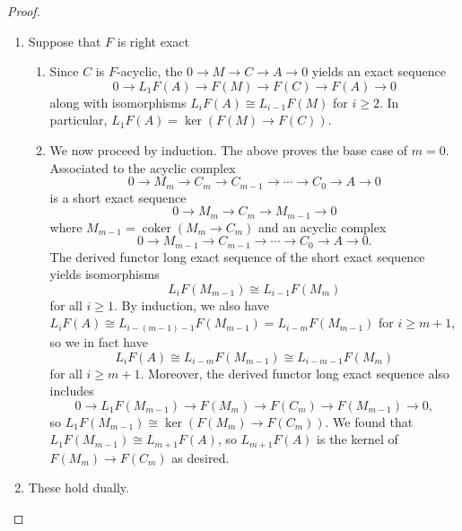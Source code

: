 \begin{proof}
    \begin{enumerate}
        \item Suppose that $F$ is right exact
        \begin{enumerate}
            \item Since $C$ is $F$-acyclic, the  $0 \to M \to C \to A \to 0$ yields an exact sequence
            $$0 \to L_1 F(A) \to F(M) \to F(C) \to F(A) \to 0$$
            along with isomorphisms $L_{i} F(A) \cong L_{i-1} F(M)$ for $i \geq 2$. In particular, $L_1F(A) = \ker (F(M) \to F(C))$.

            \item We now proceed by induction. The above proves the base case of $m = 0$. Associated to the acyclic complex
            $$0 \to M_m \to C_m \to C_{m-1} \to \cdots \to C_0 \to A \to 0$$
            is a short exact sequence
            $$0 \to M_m \to C_m \to M_{m-1} \to 0$$
            where $M_{m-1} = \operatorname{coker}(M_m \to C_{m})$ and an acyclic complex
            $$0 \to M_{m-1} \to C_{m-1} \to \cdots \to C_0 \to A \to 0.$$  
            The derived functor long exact sequence of the short exact sequence yields isomorphisms 
            $$L_iF(M_{m-1}) \cong L_{i-1} F(M_m)$$
            for all $i \geq 1$. By induction, we also have $L_iF(A) \cong L_{i-(m-1)-1} F(M_{m-1}) = L_{i-m} F(M_{m-1})$ for $i \geq m+1$, so we in fact have
            $$L_i F(A) \cong L_{i-m} F(M_{m-1}) \cong L_{i-m-1} F(M_m)$$
            for all $i \geq m+1$. Moreover, the derived functor long exact sequence also includes
            $$0 \to L_1 F(M_{m-1}) \to F(M_m) \to F(C_m) \to F(M_{m-1}) \to 0,$$
            so $L_1 F(M_{m-1}) \cong \ker (F(M_m) \to F(C_m))$. We found that $L_1F(M_{m-1}) \cong L_{m+1}F(A)$, so $L_{m+1} F(A)$ is the kernel of $F(M_m) \to F(C_m)$ as desired.
        \end{enumerate}

        \item  These hold dually.
    \end{enumerate}

    
    
    
\end{proof}
